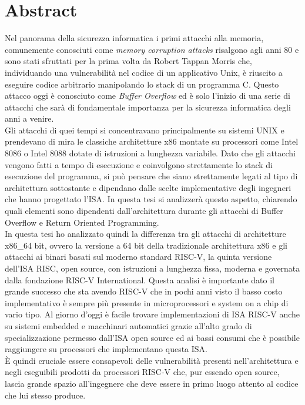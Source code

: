 \chapter*{Abstract}
Nel panorama della sicurezza informatica i primi attacchi alla memoria, comunemente conosciuti come \textit{memory corruption attacks} risalgono agli anni 80 e sono stati sfruttati per la prima volta da Robert Tappan Morris \cite{FBI} che, individuando una vulnerabilità nel codice di un applicativo Unix, è riuscito a eseguire codice arbitrario manipolando lo stack di un programma C. Questo attacco oggi è conosciuto come \textit{Buffer Overflow} ed è solo l'inizio di una serie di attacchi che sarà di fondamentale importanza per la sicurezza informatica degli anni a venire. \\
Gli attacchi di quei tempi si concentravano principalmente su sistemi UNIX e prendevano di mira le classiche architetture x86 montate su processori come Intel 8086 \cite{Intel} o Intel 8088 dotate di istruzioni a lunghezza variabile. Dato che gli attacchi vengono fatti a tempo di esecuzione e coinvolgono strettamente lo stack di esecuzione del programma, si può pensare che siano strettamente legati al tipo di architettura sottostante e dipendano dalle scelte implementative degli ingegneri che hanno progettato l'ISA. In questa tesi si analizzerà questo aspetto, chiarendo quali elementi sono dipendenti dall'architettura durante gli attacchi di Buffer Overflow e Return Oriented Programming.\\
In questa tesi ho analizzato quindi la differenza tra gli attacchi di architetture x86\_64 bit, ovvero la versione a 64 bit della tradizionale architettura x86 e gli attacchi ai binari basati sul moderno standard RISC-V, la quinta versione dell'ISA RISC, open source, con istruzioni a lunghezza fissa, moderna e governata dalla fondazione RISC-V International. Questa analisi è importante dato il grande successo che sta avendo RISC-V che in pochi anni visto il basso costo implementativo è sempre più presente in microprocessori e system on a chip di vario tipo. Al giorno d'oggi è facile trovare implementazioni di ISA RISC-V anche su sistemi embedded e macchinari automatici grazie all'alto grado di specializzazione permesso dall'ISA open source ed ai bassi consumi che è possibile raggiungere su processori che implementano questa ISA. \\
È quindi cruciale essere consapevoli delle vulnerabilità presenti nell'architettura e negli eseguibili prodotti da processori RISC-V che, pur essendo open source, lascia grande spazio all'ingegnere che deve essere in primo luogo attento al codice che lui stesso produce. \\
